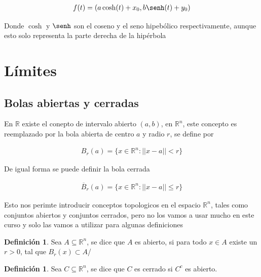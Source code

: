 \documentclass{article}
\theoremstyle{plain}
\theoremstyle{definition}
\newtheorem{defin}[thm]{Definición}
\begin{document}
\begin{align*}
f(t) = \left( a\cosh(t)+x_0, b\senh(t)+y_0 \right)
\end{align*}

Donde $\cosh$ y $\senh$ son el coseno y el seno hipebólico respectivamente, aunque esto solo representa la parte derecha de la hipérbola



\newpage


\newpage

\section{Límites}

\subsection{Bolas abiertas y cerradas}

En $\mathbb{R}$ existe el conepto de intervalo abierto $(a,b)$, en $\mathbb{R}^n$, este concepto es reemplazado por la bola abierta de centro $a$ y radio $r$, se define por

\begin{align*}
B_r(a) = \lbrace x \in \mathbb{R}^n : || x-a || < r \rbrace
\end{align*}


De igual forma se puede definir la bola cerrada


\begin{align*}
\overline{B}_r (a) = \lbrace x \in \mathbb{R}^n : || x-a || \leq r \rbrace
\end{align*}


Esto nos perimte introducir conceptos topologicos en el espacio $\mathbb{R}^n$, tales como conjuntos abiertos y conjuntos cerrados, pero no los vamos a usar mucho en este curso y solo las vamos a utilizar para algunas definiciones \\

\begin{defin}Sea $A \subseteq \mathbb{R}^n$, se dice que $A$ es abierto, si para todo $x \in A$ existe un $r > 0$, tal que $B_r(x) \subset A$/ \\
\end{defin}

\begin{defin}Sea $C \subseteq \mathbb{R}^n$, se dice que $C$ es cerrado si $C^c$ es abierto. \\
\end{defin}
\end{document}
